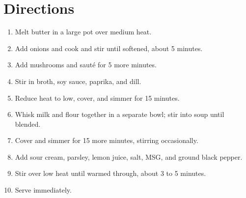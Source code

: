 \documentclass[11pt,letterpaper]{article}
\begin{document}
\section*{Directions}
\begin{enumerate}
    \item Melt butter in a large pot over medium heat.
    \item Add onions and cook and stir until softened, about 5 minutes.
    \item Add mushrooms and sauté for 5 more minutes.
    \item Stir in broth, soy sauce, paprika, and dill.
    \item Reduce heat to low, cover, and simmer for 15 minutes.
    \item Whisk milk and flour together in a separate bowl; stir into soup until blended.
    \item Cover and simmer for 15 more minutes, stirring occasionally.
    \item Add sour cream, parsley, lemon juice, salt, MSG, and ground black pepper.
    \item Stir over low heat until warmed through, about 3 to 5 minutes.
    \item Serve immediately.
\end{enumerate}
\end{document}
